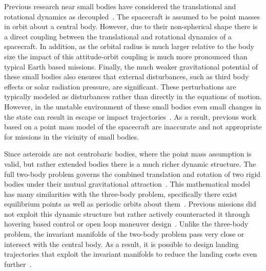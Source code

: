 \documentclass[11pt]{article} %
\begin{document}
Previous research near small bodies have considered the translational and rotational dynamics as decoupled~\cite{broschart2005,scheeres1994}.
The spacecraft is assumed to be point masses in orbit about a central body.
However, due to their non-spherical shape there is a direct coupling between the translational and rotational dynamics of a spacecraft.
In addition, as the orbital radius is much larger relative to the body size the impact of this attitude-orbit coupling is much more pronounced than typical Earth based missions. 
Finally, the much weaker gravitational potential of these small bodies also ensures that external disturbances, such as third body effects or solar radiation pressure, are significant.
These perturbations are typically modeled as disturbances rather than directly in the equations of motion. 
However, in the unstable environment of these small bodies even small changes in the state can result in escape or impact trajectories~\cite{scheeres2012}.
As a result, previous work based on a point mass model of the spacecraft are inaccurate and not appropriate for missions in the vicinity of small bodies. 

Since asteroids are not centrobaric bodies, where the point mass assumption is valid, but rather extended bodies there is a much richer dynamic structure.
The full two-body problem governs the combined translation and rotation of two rigid bodies under their mutual gravitational attraction~\cite{fahnestock2006}. 
This mathematical model has many similarities with the three-body problem, specifically there exist equilibrium points as well as periodic orbits about them~\cite{scheeres1994,koon2000}.
Previous missions did not exploit this dynamic structure but rather actively counteracted it through hovering based control or open loop maneuver design~\cite{broschart2005,antreasian2002}.
Unlike the three-body problem, the invariant manifolds of the two-body problem pass very close or intersect with the central body. 
As a result, it is possible to design landing trajectories that exploit the invariant manifolds to reduce the landing costs even further~\cite{herrera2014}.  

\end{document}
